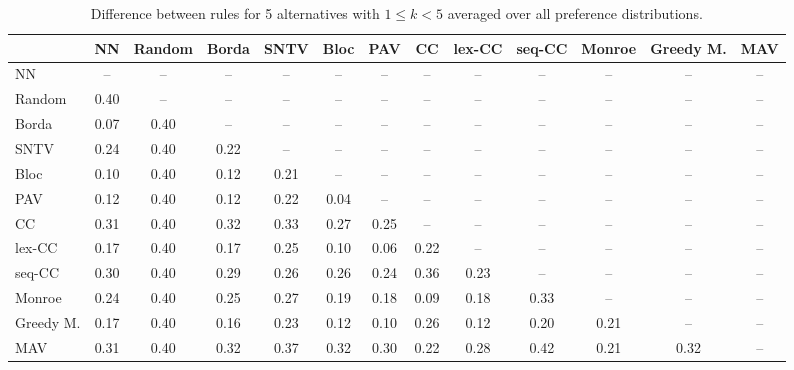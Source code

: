 
\begin{table*}[h!]
\centering
\begin{tabular}{lcccccccccccc}
\toprule
 & NN & Random & Borda & SNTV & Bloc & PAV & CC & lex-CC & seq-CC & Monroe & Greedy M. & MAV \\
\midrule
NN & -- & -- & -- & -- & -- & -- & -- & -- & -- & -- & -- & -- \\
Random & 0.40 & -- & -- & -- & -- & -- & -- & -- & -- & -- & -- & -- \\
Borda & 0.07 & 0.40 & -- & -- & -- & -- & -- & -- & -- & -- & -- & -- \\
SNTV & 0.24 & 0.40 & 0.22 & -- & -- & -- & -- & -- & -- & -- & -- & -- \\
Bloc & 0.10 & 0.40 & 0.12 & 0.21 & -- & -- & -- & -- & -- & -- & -- & -- \\
PAV & 0.12 & 0.40 & 0.12 & 0.22 & 0.04 & -- & -- & -- & -- & -- & -- & -- \\
CC & 0.31 & 0.40 & 0.32 & 0.33 & 0.27 & 0.25 & -- & -- & -- & -- & -- & -- \\
lex-CC & 0.17 & 0.40 & 0.17 & 0.25 & 0.10 & 0.06 & 0.22 & -- & -- & -- & -- & -- \\
seq-CC & 0.30 & 0.40 & 0.29 & 0.26 & 0.26 & 0.24 & 0.36 & 0.23 & -- & -- & -- & -- \\
Monroe & 0.24 & 0.40 & 0.25 & 0.27 & 0.19 & 0.18 & 0.09 & 0.18 & 0.33 & -- & -- & -- \\
Greedy M. & 0.17 & 0.40 & 0.16 & 0.23 & 0.12 & 0.10 & 0.26 & 0.12 & 0.20 & 0.21 & -- & -- \\
MAV & 0.31 & 0.40 & 0.32 & 0.37 & 0.32 & 0.30 & 0.22 & 0.28 & 0.42 & 0.21 & 0.32 & -- \\
\bottomrule
\end{tabular}

\caption{Difference between rules for 5 alternatives with $1 \leq k < 5$ averaged over all preference distributions.}
\end{table*}
